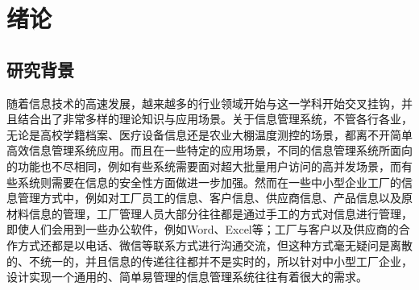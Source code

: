 \section{绪论}
\setlength{\baselineskip}{20pt}
\fancyhf{}
\renewcommand{\headrulewidth}{0.5pt}

\subsection{研究背景}

随着信息技术的高速发展，越来越多的行业领域开始与这一学科开始交叉挂钩，并且结合出了非常多样的理论知识与应用场景。关于信息管理系统，不管各行各业，无论是高校学籍档案、医疗设备信息还是农业大棚温度测控的场景，都离不开简单高效信息管理系统应用。而且在一些特定的应用场景，不同的信息管理系统所面向的功能也不尽相同，例如有些系统需要面对超大批量用户访问的高并发场景，而有些系统则需要在信息的安全性方面做进一步加强。然而在一些中小型企业工厂的信息管理方式中，例如对工厂员工的信息、客户信息、供应商信息、产品信息以及原材料信息的管理，工厂管理人员大部分往往都是通过手工的方式对信息进行管理，即使人们会用到一些办公软件，例如Word、Excel等；工厂与客户以及供应商的合作方式还都是以电话、微信等联系方式进行沟通交流，但这种方式毫无疑问是离散的、不统一的，并且信息的传递往往都并不是实时的，所以针对中小型工厂企业，设计实现一个通用的、简单易管理的信息管理系统往往有着很大的需求。
